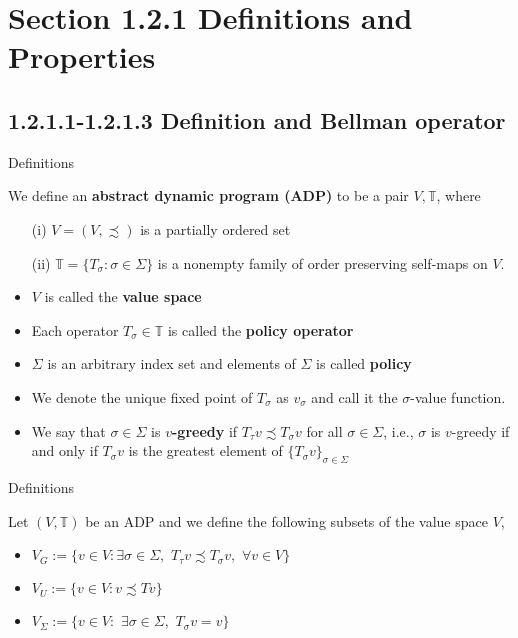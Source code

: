 \section{Section 1.2.1 Definitions and Properties}
\subsection{1.2.1.1-1.2.1.3 Definition and Bellman operator}
\begin{frame}{Definitions}
    \begin{definition}
        We define an \textbf{abstract dynamic program (ADP)} to be a pair $V,\mathbb{T}$, where
        \begin{enumerate}
            \item[(i)] $V = (V,\precsim)$ is a partially ordered set
            \item[(ii)] $\mathbb{T} = \{T_\sigma: \sigma\in\Sigma\}$ is a nonempty family of order preserving self-maps on $V$.
        \end{enumerate}
    \end{definition}
    \begin{definition}
        \begin{itemize}
            \item $V$ is called the \textbf{value space}
            \item Each operator $T_\sigma\in\mathbb{T}$ is called the \textbf{policy operator}
            \item $\Sigma$ is an arbitrary index set and elements of $\Sigma$ is called \textbf{policy}
            \item We denote the unique fixed point of $T_\sigma$ as $v_\sigma$ and call it the $\sigma$-value function.
            \item We say that $\sigma\in\Sigma$ is \textbf{$v$-greedy} if $T_\tau v\precsim T_\sigma v$ for all $\sigma\in\Sigma$, i.e., $\sigma$ is $v$-greedy if and only if $T_\sigma v$ is the greatest element of $\{T_\sigma v\}_{\sigma\in\Sigma}$
        \end{itemize}
    \end{definition}
\end{frame}
\begin{frame}{Definitions}
\begin{definition}
    Let $(V,\mathbb{T})$ be an ADP and we define the following subsets of the value space $V$,
    \begin{itemize}
        \item $V_G:=\{v\in V: \exists \sigma\in\Sigma,\,\, T_\tau v\precsim T_\sigma v, \,\,\forall v\in V\}$ 
        \item $V_U:=\{v\in V: v\precsim Tv\}$
        \item $V_\Sigma:= \{v\in V:\,\,\exists \sigma\in\Sigma, \,\, T_\sigma v = v\}$
    \end{itemize}
\end{definition}
\end{frame}
